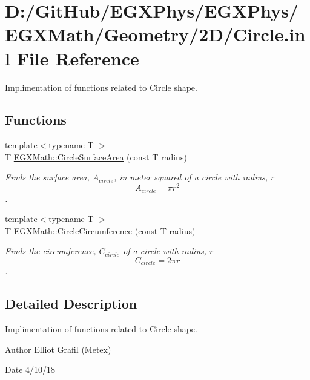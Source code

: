 \hypertarget{_circle_8inl}{}\section{D\+:/\+Git\+Hub/\+E\+G\+X\+Phys/\+E\+G\+X\+Phys/\+E\+G\+X\+Math/\+Geometry/2\+D/\+Circle.inl File Reference}
\label{_circle_8inl}


Implimentation of functions related to Circle shape.  


\subsection*{Functions}
\begin{DoxyCompactItemize}
\item 
{\footnotesize template$<$typename T $>$ }\\T \mbox{\hyperlink{group___e_g_x_math-_geometry-2_d-_circle_gaa4486100a643c57bd7a80c1c11ae3f60}{E\+G\+X\+Math\+::\+Circle\+Surface\+Area}} (const T radius)
\begin{DoxyCompactList}\small\item\em Finds the surface area, $A_{circle}$, in meter squared of a circle with radius, $r$ \[ A_{circle}=\pi r^2 \]. \end{DoxyCompactList}\item 
{\footnotesize template$<$typename T $>$ }\\T \mbox{\hyperlink{group___e_g_x_math-_geometry-2_d-_circle_gadb55695b75a06a3f3534494eb767e18e}{E\+G\+X\+Math\+::\+Circle\+Circumference}} (const T radius)
\begin{DoxyCompactList}\small\item\em Finds the circumference, $C_{circle}$ of a circle with radius, $r$ \[ C_{circle}=2 \pi r \]. \end{DoxyCompactList}\end{DoxyCompactItemize}


\subsection{Detailed Description}
Implimentation of functions related to Circle shape. 

\begin{DoxyAuthor}{Author}
Elliot Grafil (Metex) 
\end{DoxyAuthor}
\begin{DoxyDate}{Date}
4/10/18 
\end{DoxyDate}

